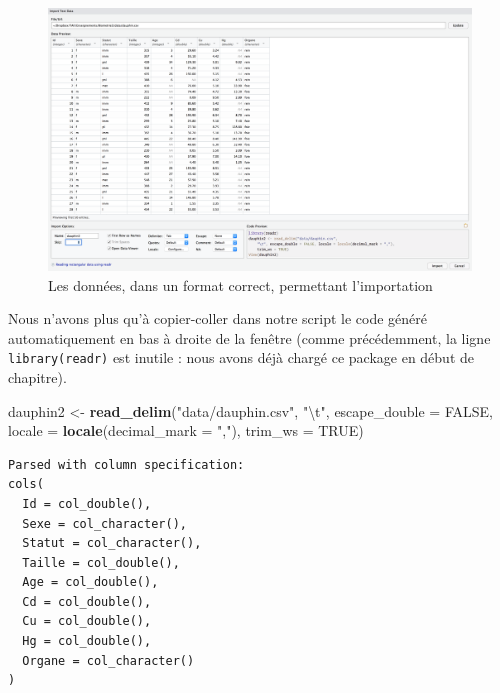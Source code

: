 \documentclass[a4paperpaper,]{article}
\newenvironment{Shaded}{\begin{snugshade}}{\end{snugshade}}
\newcommand{\CharTok}[1]{\textcolor[rgb]{0.57,0.30,0.62}{#1}}
\newcommand{\DataTypeTok}[1]{\textcolor[rgb]{0.00,0.34,0.68}{#1}}
\newcommand{\KeywordTok}[1]{\textcolor[rgb]{0.12,0.11,0.11}{\textbf{#1}}}
\newcommand{\NormalTok}[1]{\textcolor[rgb]{0.12,0.11,0.11}{#1}}
\newcommand{\OtherTok}[1]{\textcolor[rgb]{0.00,0.43,0.16}{#1}}
\newcommand{\StringTok}[1]{\textcolor[rgb]{0.75,0.01,0.01}{#1}}
\theoremstyle{definition}
\theoremstyle{definition}
\theoremstyle{definition}
\theoremstyle{remark}
\begin{document}
\begin{figure}[htpb]

{\centering \includegraphics[width=1\linewidth]{images/importcsv4} 

}

\caption{Les données, dans un format correct, permettant l'importation}\label{fig:importcsv4}
\end{figure}

Nous n'avons plus qu'à copier-coller dans notre script le code généré
automatiquement en bas à droite de la fenêtre (comme précédemment, la
ligne \texttt{library(readr)} est inutile : nous avons déjà chargé ce
package en début de chapitre).

\begin{Shaded}
\begin{Highlighting}[]
\NormalTok{dauphin2 <-}\StringTok{ }\KeywordTok{read_delim}\NormalTok{(}\StringTok{"data/dauphin.csv"}\NormalTok{, }
    \StringTok{"}\CharTok{\textbackslash{}t}\StringTok{"}\NormalTok{, }\DataTypeTok{escape_double =} \OtherTok{FALSE}\NormalTok{, }\DataTypeTok{locale =} \KeywordTok{locale}\NormalTok{(}\DataTypeTok{decimal_mark =} \StringTok{","}\NormalTok{), }
    \DataTypeTok{trim_ws =} \OtherTok{TRUE}\NormalTok{)}
\end{Highlighting}
\end{Shaded}

\begin{verbatim}
Parsed with column specification:
cols(
  Id = col_double(),
  Sexe = col_character(),
  Statut = col_character(),
  Taille = col_double(),
  Age = col_double(),
  Cd = col_double(),
  Cu = col_double(),
  Hg = col_double(),
  Organe = col_character()
)
\end{verbatim}
\end{document}
